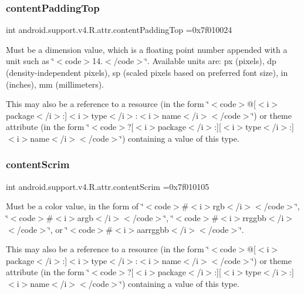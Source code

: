 \subsubsection{\texorpdfstring{content\+Padding\+Top}{contentPaddingTop}}
{\footnotesize\ttfamily int android.\+support.\+v4.\+R.\+attr.\+content\+Padding\+Top =0x7f010024\hspace{0.3cm}{\ttfamily [static]}}

Must be a dimension value, which is a floating point number appended with a unit such as \char`\"{}$<$code$>$14.\+5sp$<$/code$>$\char`\"{}. Available units are\+: px (pixels), dp (density-\/independent pixels), sp (scaled pixels based on preferred font size), in (inches), mm (millimeters). 

This may also be a reference to a resource (in the form \char`\"{}$<$code$>$@\mbox{[}$<$i$>$package$<$/i$>$\+:\mbox{]}$<$i$>$type$<$/i$>$\+:$<$i$>$name$<$/i$>$$<$/code$>$\char`\"{}) or theme attribute (in the form \char`\"{}$<$code$>$?\mbox{[}$<$i$>$package$<$/i$>$\+:\mbox{]}\mbox{[}$<$i$>$type$<$/i$>$\+:\mbox{]}$<$i$>$name$<$/i$>$$<$/code$>$\char`\"{}) containing a value of this type. \mbox{\label{classandroid_1_1support_1_1v4_1_1R_1_1attr_a11f2cc81c0a1252de7118bf7a3adc19e}} 
\subsubsection{\texorpdfstring{content\+Scrim}{contentScrim}}
{\footnotesize\ttfamily int android.\+support.\+v4.\+R.\+attr.\+content\+Scrim =0x7f010105\hspace{0.3cm}{\ttfamily [static]}}

Must be a color value, in the form of \char`\"{}$<$code$>$\#$<$i$>$rgb$<$/i$>$$<$/code$>$\char`\"{}, \char`\"{}$<$code$>$\#$<$i$>$argb$<$/i$>$$<$/code$>$\char`\"{}, \char`\"{}$<$code$>$\#$<$i$>$rrggbb$<$/i$>$$<$/code$>$\char`\"{}, or \char`\"{}$<$code$>$\#$<$i$>$aarrggbb$<$/i$>$$<$/code$>$\char`\"{}. 

This may also be a reference to a resource (in the form \char`\"{}$<$code$>$@\mbox{[}$<$i$>$package$<$/i$>$\+:\mbox{]}$<$i$>$type$<$/i$>$\+:$<$i$>$name$<$/i$>$$<$/code$>$\char`\"{}) or theme attribute (in the form \char`\"{}$<$code$>$?\mbox{[}$<$i$>$package$<$/i$>$\+:\mbox{]}\mbox{[}$<$i$>$type$<$/i$>$\+:\mbox{]}$<$i$>$name$<$/i$>$$<$/code$>$\char`\"{}) containing a value of this type. \mbox{\label{classandroid_1_1support_1_1v4_1_1R_1_1attr_aed7c85a829b27222bdb9dec6505a706f}} 
